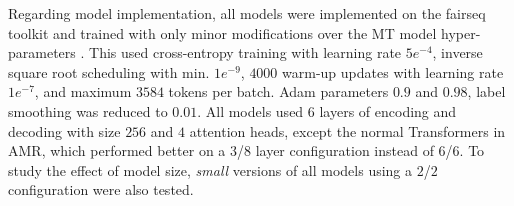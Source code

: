 \documentclass[11pt,a4paper]{article}
\begin{document}
\begin{table}[!t]
\centering
{}
\caption{Test-set performance for Table~\ref{table:dev} selections and prior art on the English Penn-Treebank.}
\label{table:dep-test}
\end{table}

Regarding model implementation, all models were implemented on the fairseq toolkit and trained with only minor modifications over the MT model hyper-parameters \cite{ott2018scaling}. This used cross-entropy training with learning rate $5e^{-4}$, inverse square root scheduling with min. $1e^{-9}$, $4000$ warm-up updates with learning rate $1e^{-7}$, and maximum $3584$ tokens per batch. Adam parameters $0.9$ and $0.98$, label smoothing was reduced to $0.01$\footnotemark{}. All models used $6$ layers of encoding and decoding with size $256$ and $4$ attention heads, except the normal Transformers in AMR, which performed better on a $3$/$8$ layer configuration instead of $6$/$6$. To study the effect of model size, \textit{small} versions of all models using a $2$/$2$ configuration were also tested. 
\end{document}
